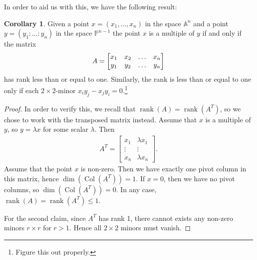 \documentclass{article}
\theoremstyle{definition}
\newtheorem{corollary}{Corollary}
\newcommand{\A}{\mathbb{A}}
\renewcommand{\P}{\mathbb{P}}
\DeclareMathOperator{\rank}{rank}
\DeclareMathOperator{\col}{Col}
\begin{document}
In order to aid us with this, we have the following result:
\begin{corollary}
    \label{crl:minors}
    Given a point $x = (x_1, \ldots, x_n)$ in the space $\A^n$ and a point $y =
    \left( y_1 : \ldots : y_n \right)$ in the space $\P^{n-1}$ the point
    $x$ is a multiple of $y$ if and only if the matrix
    \begin{equation}
        \notag
        A = 
        \begin{bmatrix}
            x_1 & x_2 & \hdots & x_n \\
            y_1 & y_2 & \hdots & y_n
        \end{bmatrix}
    \end{equation}
    has rank less than or equal to one. Similarly, the rank is less than or
    equal to one only if each $2\times2$-minor $x_iy_j - x_jy_i =
    0$.\footnote{Figure this out properly.}
\end{corollary}
\begin{proof}
    In order to verify this, we recall that $\rank(A) = \rank(A^T)$, so we
    chose to work with the transposed matrix instead. Assume that $x$ is a
    multiple of $y$, so $y = \lambda x$ for some scalar $\lambda$.  Then
    \begin{align*}
        A^T = \begin{bmatrix}
            x_1 & \lambda x_1 \\
            \vdots & \vdots \\
            x_n & \lambda x_n
        \end{bmatrix}.
    \end{align*}
    Assume that the point $x$ is non-zero. Then we have exactly one pivot
    column in this matrix, hence $\dim(\col(A^T)) = 1$. If $x = 0$, then we have
    no pivot columns, so $\dim(\col(A^T)) = 0$. In any case, $\rank(A) =
    \rank(A^T) \leq 1$.

    For the second claim, since $A^T$ has rank 1, there cannot exists any
    non-zero minors $r\times r$ for $r > 1$. Hence all $2\times 2$ minors must
    vanish.
\end{proof}
\end{document}

